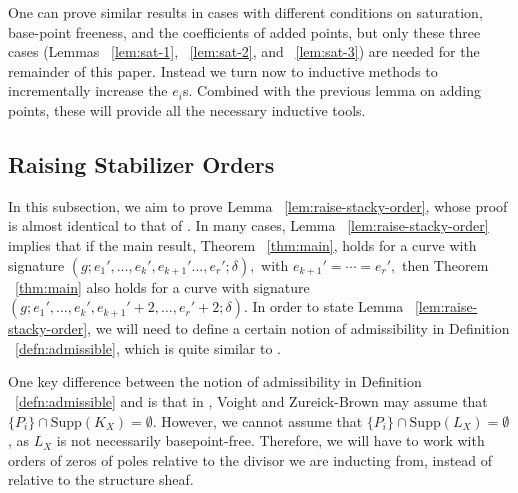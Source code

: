 \documentclass{amsart}
\theoremstyle{plain}
\theoremstyle{definition}
\theoremstyle{remark}
\numberwithin{equation}{section}
\newcommand\ssec{\subsection}
\newcommand \Supp{\text{Supp}}
\newcommand \initial{\text{in}}
\begin{document}
%

One can prove similar results in cases with different conditions on saturation, base-point freeness, and the coefficients of added points, but only these three cases (Lemmas ~\ref{lem:sat-1}, ~\ref{lem:sat-2}, and ~\ref{lem:sat-3}) are needed for the remainder of this paper.  Instead we turn now to inductive methods to incrementally increase the $e_i$s.  Combined with the previous lemma on adding points, these will provide all the necessary inductive tools.

\ssec{Raising Stabilizer Orders}
\label{ssec:raise-orders}
In this subsection, we aim to prove Lemma
~\ref{lem:raise-stacky-order}, whose proof is almost identical to that of \cite[Theorem 8.5.7]{vzb:stacky}. In many cases, Lemma ~\ref{lem:raise-stacky-order} implies that if the main result, Theorem 
~\ref{thm:main}, holds for a curve with signature
$(g;e_1', \ldots, e_k', e_{k+1}' \ldots, e_r';\delta),$ with $e_{k+1}' = \cdots = e_r',$ then Theorem ~\ref{thm:main} also holds for a curve with
signature $(g; e_1', \ldots, e_k',e_{k+1}'+2,\ldots, e_r'+2; \delta).$ In order to state Lemma
~\ref{lem:raise-stacky-order}, we will need to define a certain notion of admissibility in Definition ~\ref{defn:admissible}, which is quite similar to \cite[Definition 8.5.1]{vzb:stacky}.

One key difference between the notion of admissibility in Definition ~\ref{defn:admissible} and \cite[Definition 8.5.1]{vzb:stacky} is that in \cite{vzb:stacky}, Voight and Zureick-Brown may assume that $\{P_i\} \cap \Supp(K_X) = \emptyset.$ However, we cannot assume that $\{P_i\} \cap \Supp(L_X) = \emptyset$, as $L_X$ is not necessarily basepoint-free. Therefore, we will have to work with orders of zeros of poles relative to the divisor we are inducting from, instead of relative to the structure sheaf.
\end{document}
